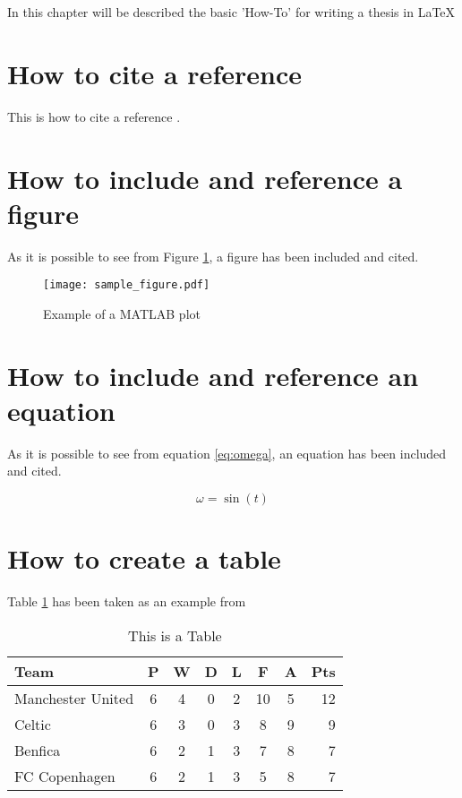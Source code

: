 In this chapter will be described the basic 'How-To' for writing a thesis in \LaTeX

\section{How to cite a reference} 
This is how to cite a reference \cite{Dijkstra68Letters}.

\section{How to include and reference a figure}
As it is possible to see from Figure \ref{fig:sample_figure}, a figure has been included and cited.

\begin{figure}[htbp]
\centering
\texttt{[image: sample\_figure.pdf]}
\caption{Example of a MATLAB plot}
\label{fig:sample_figure}
\end{figure}

\section{How to include and reference an equation}
As it is possible to see from equation \eqref{eq:omega}, an equation has been included and cited.

\begin{equation}
\omega = \sin(t)
\label{eq:omega}
\end{equation}

\section{How to create a table}
Table \ref{tab:sample_table} has been taken as an example from \cite{latexTables}

\begin{table}
\centering
\begin{tabular}{l*{6}{c}r}
Team              & P & W & D & L & F  & A & Pts \\
\hline
Manchester United & 6 & 4 & 0 & 2 & 10 & 5 & 12  \\
Celtic            & 6 & 3 & 0 & 3 &  8 & 9 &  9  \\
Benfica           & 6 & 2 & 1 & 3 &  7 & 8 &  7  \\
FC Copenhagen     & 6 & 2 & 1 & 3 &  5 & 8 &  7  \\
\end{tabular}
\caption{This is a Table}
\label{tab:sample_table}
\end{table}